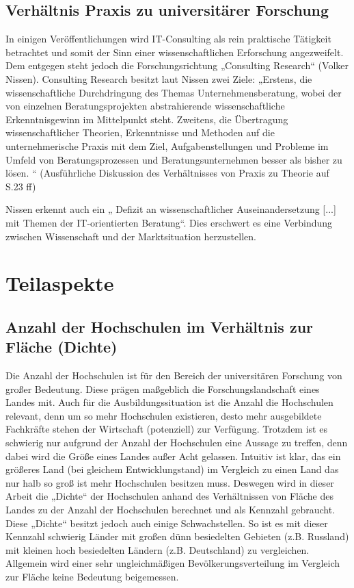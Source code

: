 \subsection{Verhältnis Praxis zu universitärer Forschung}
In einigen Veröffentlichungen wird IT-Consulting als rein praktische Tätigkeit betrachtet und somit der Sinn einer wissenschaftlichen Erforschung angezweifelt. Dem entgegen steht jedoch die Forschungsrichtung „Consulting Research“ (Volker Nissen). Consulting Research besitzt laut Nissen zwei Ziele: „Erstens, die wissenschaftliche Durchdringung des Themas Unternehmensberatung, wobei der von einzelnen Beratungsprojekten abstrahierende wissenschaftliche Erkenntnisgewinn im Mittelpunkt steht. Zweitens, die Übertragung wissenschaftlicher Theorien, Erkenntnisse und Methoden auf die unternehmerische Praxis mit dem Ziel, Aufgabenstellungen und Probleme im Umfeld von Beratungsprozessen und Beratungsunternehmen besser als bisher zu lösen. “
(Ausführliche Diskussion des Verhältnisses von Praxis zu Theorie auf S.23 ff)

Nissen erkennt auch ein „ Defizit an wissenschaftlicher Auseinandersetzung [...] mit Themen der IT-orientierten Beratung“. Dies erschwert es eine Verbindung zwischen Wissenschaft und der Marktsituation herzustellen.

\section{Teilaspekte}

\subsection{ Anzahl der Hochschulen im Verhältnis zur Fläche (Dichte)}
Die Anzahl der Hochschulen ist für den Bereich der universitären Forschung von großer Bedeutung. Diese prägen maßgeblich die Forschungslandschaft eines Landes mit. Auch für die Ausbildungssituation ist die Anzahl die Hochschulen relevant, denn um so mehr Hochschulen existieren, desto mehr ausgebildete Fachkräfte stehen der Wirtschaft (potenziell) zur Verfügung. 
Trotzdem ist es schwierig nur aufgrund der Anzahl der Hochschulen eine Aussage zu treffen, denn dabei wird die Größe eines Landes außer Acht gelassen. Intuitiv ist klar, das ein größeres Land (bei gleichem Entwicklungstand) im Vergleich zu einen Land das nur halb so groß ist mehr Hochschulen besitzen muss. Deswegen wird in dieser Arbeit die „Dichte“ der Hochschulen anhand des Verhältnissen von  Fläche des Landes zu der Anzahl der Hochschulen berechnet und als Kennzahl gebraucht.
Diese „Dichte“ besitzt jedoch auch einige Schwachstellen. So ist es mit dieser Kennzahl schwierig Länder mit großen dünn besiedelten Gebieten (z.B. Russland) mit kleinen hoch besiedelten Ländern (z.B. Deutschland) zu vergleichen. Allgemein wird einer sehr ungleichmäßigen Bevölkerungsverteilung im Vergleich zur Fläche keine Bedeutung beigemessen.

